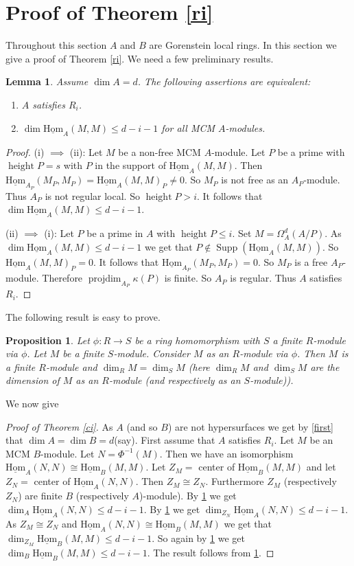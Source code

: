 \documentclass{amsart}
\newcommand{\rt}{\rightarrow}
\newcommand{\height}{\operatorname{height}}
\newcommand{\Supp}{\operatorname{Supp}}
\newcommand{\projdim}{\operatorname{projdim}}
\newcommand{\sHom}{\operatorname{\underline{Hom}}}
\theoremstyle{plain}
\newtheorem{lemma}[theorem]{Lemma}
\newtheorem{proposition}[theorem]{Proposition}
\theoremstyle{definition}
\theoremstyle{remark}
\begin{document}
{\section{Proof of Theorem \ref{ri}}
Throughout this section $A$ and $B$ are Gorenstein local rings. In this section we give a proof of Theorem \ref{ri}. We need a few preliminary results.

\begin{lemma}\label{pet}
Assume $\dim A = d$.
The following assertions are equivalent:
\begin{enumerate}[\rm (i)]
  \item $A$ satisfies $R_i$.
  \item $\dim \sHom_A(M, M) \leq d -i - 1$ for all MCM $A$-modules.
\end{enumerate}
\end{lemma}
\begin{proof}
  (i) $\implies$ (ii): Let $M$ be a non-free MCM $A$-module. Let $P$ be a prime with $\height P = s$ with $P$ in the support of $\sHom_A(M, M)$. Then $\sHom_{A_P}(M_P, M_P) = \sHom_A(M, M)_P \neq 0$. So $M_P$ is not free as an $A_P$-module. Thus $A_P$ is not regular local. So $\height P > i$. It follows that $\dim \sHom_A(M, M) \leq d -i - 1$.

  (ii) $\implies$ (i): Let $P$ be a prime in $A$ with $\height P \leq  i$. Set $M = \Omega^d_A(A/P)$. As $\dim \sHom_A(M, M) \leq d -i - 1$ we get that $P \notin \Supp(\sHom_A(M, M))$.
  So $\sHom_A(M, M)_P = 0$. It follows that  $\sHom_{A_P}(M_P, M_P) = 0$. So $M_P$  is a free $A_P$-module. Therefore $\projdim_{A_P} \kappa(P)$ is finite. So $A_P$ is regular. Thus $A$ satisfies $R_i$.
\end{proof}
The following result is easy to prove.
\begin{proposition}
\label{baby} Let $\phi \colon  R \rt S$ be a ring homomorphism with $S$ a finite $R$-module via $\phi$. Let $M$ be a finite $S$-module. Consider $M$ as an $R$-module via $\phi$. Then $M$ is a finite $R$-module and $\dim_R M = \dim_S M$ (here $\dim_R M$ and $\dim_S M$ are the dimension of $M$ as an $R$-module (and respectively as an $S$-module)).
\end{proposition}
We now give
\begin{proof}[Proof of Theorem \ref{ci}]
As $A$ (and so $B$) are not hypersurfaces we get by \ref{first} that $\dim A = \dim B = d$(say). First assume that $A$ satisfies $R_i$. Let $M$ be an MCM $B$-module. Let $N = \Phi^{-1}(M)$. Then
we have an isomorphism $\sHom_A(N, N) \cong \sHom_B(M, M)$. Let $Z_M = $ center of $\sHom_B(M,M)$ and let \\ $Z_N = $ center of $\sHom_A(N,N)$. Then $Z_M \cong Z_N$. Furthermore $Z_M$ (respectively $Z_N$) are finite $B$ (respectively $A$)-module). By \ref{pet} we get $\dim_A \sHom_A(N, N) \leq d - i -1$. By \ref{baby} we get $\dim_{Z_N} \sHom_A(N, N) \leq d - i -1$. As $Z_M \cong Z_N$ and
$\sHom_A(N, N) \cong \sHom_B(M, M)$ we get that $\dim_{Z_M} \sHom_B(M,M) \leq d - i -1$. So again by \ref{baby} we get $\dim_B \sHom_B(M, M) \leq d -i - 1$. The result follows from \ref{pet}.
\end{proof}

}
\end{document}

